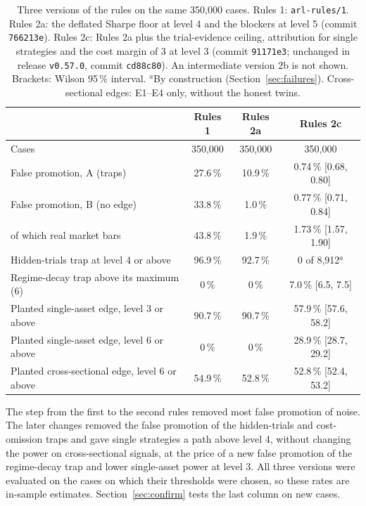 \documentclass[11pt]{article}
\begin{document}
\begin{table}[ht]
\centering\small
\begin{tabular}{@{}lccc@{}}
\toprule
 & Rules 1 & Rules 2a & Rules 2c\\
\midrule
Cases & 350,000 & 350,000 & 350,000 \\
False promotion, A (traps) & 27.6\,\% & 10.9\,\% & 0.74\,\% [0.68, 0.80] \\
False promotion, B (no edge) & 33.8\,\% & 1.0\,\% & 0.77\,\% [0.71, 0.84] \\
\quad of which real market bars & 43.8\,\% & 1.9\,\% & 1.73\,\% [1.57, 1.90] \\
Hidden-trials trap at level 4 or above & 96.9\,\% & 92.7\,\% & 0 of 8,912$^{a}$ \\
Regime-decay trap above its maximum (6) & 0\,\% & 0\,\% & 7.0\,\% [6.5, 7.5] \\
Planted single-asset edge, level 3 or above & 90.7\,\% & 90.7\,\% & 57.9\,\% [57.6, 58.2] \\
Planted single-asset edge, level 6 or above & 0\,\% & 0\,\% & 28.9\,\% [28.7, 29.2] \\
Planted cross-sectional edge, level 6 or above & 54.9\,\% & 52.8\,\% & 52.8\,\% [52.4, 53.2] \\
\bottomrule
\end{tabular}
\caption{Three versions of the rules on the same 350,000 cases. Rules 1: \texttt{arl-rules/1}. Rules 2a: the deflated
Sharpe floor at level 4 and the blockers at level 5 (commit \texttt{766213e}). Rules 2c: Rules 2a plus the
trial-evidence ceiling, attribution for single strategies and the cost margin of 3 at level 3 (commit \texttt{91171e3};
unchanged in release \texttt{v0.57.0}, commit \texttt{cd88c80}). An intermediate version 2b is not shown. Brackets:
Wilson 95\,\% interval. $^{a}$By construction (Section~\ref{sec:failures}). Cross-sectional edges: E1--E4 only, without
the honest twins.}\label{tab:calib}
\end{table}

The step from the first to the second rules removed most false promotion of noise. The later changes removed the false
promotion of the hidden-trials and cost-omission traps and gave single strategies a path above level 4, without changing
the power on cross-sectional signals, at the price of a new false promotion of the regime-decay trap and lower
single-asset power at level 3. All three versions were evaluated on the cases on which their thresholds were chosen, so
these rates are in-sample estimates. Section~\ref{sec:confirm} tests the last column on new cases.
\end{document}
